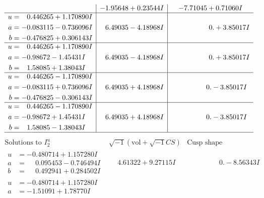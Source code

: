 \documentclass[1p]{elsarticle_modified}
\theoremstyle{definition}
\newcommand{\I}{\sqrt{-1}}
\begin{document}
$$\begin{array}{c|c|c}
 & -1.95648 + 0.23544 I & -7.71045 + 0.71060 I \\ \hline\begin{aligned}
u &= \phantom{-}0.446265 + 1.170890 I \\
a &= -0.083115 - 0.736096 I \\
b &= -0.476825 + 0.306143 I\end{aligned}
 & \phantom{-}6.49035 - 4.18968 I & \phantom{-0.000000 -}0. + 3.85017 I \\ \hline\begin{aligned}
u &= \phantom{-}0.446265 + 1.170890 I \\
a &= -0.98672 - 1.45431 I \\
b &= \phantom{-}1.58085 + 1.38043 I\end{aligned}
 & \phantom{-}6.49035 - 4.18968 I & \phantom{-0.000000 -}0. + 3.85017 I \\ \hline\begin{aligned}
u &= \phantom{-}0.446265 - 1.170890 I \\
a &= -0.083115 + 0.736096 I \\
b &= -0.476825 - 0.306143 I\end{aligned}
 & \phantom{-}6.49035 + 4.18968 I & \phantom{-0.000000 } 0. - 3.85017 I \\ \hline\begin{aligned}
u &= \phantom{-}0.446265 - 1.170890 I \\
a &= -0.98672 + 1.45431 I \\
b &= \phantom{-}1.58085 - 1.38043 I\end{aligned}
 & \phantom{-}6.49035 + 4.18968 I & \phantom{-0.000000 } 0. - 3.85017 I\\
 \hline 
 \end{array}$$\newpage$$\begin{array}{c|c|c}  
\text{Solutions to }I^u_{2}& \I (\text{vol} + \sqrt{-1}CS) & \text{Cusp shape}\\
 \hline 
\begin{aligned}
u &= -0.480714 + 1.157280 I \\
a &= \phantom{-}0.095453 - 0.746494 I \\
b &= \phantom{-}0.492941 + 0.284502 I\end{aligned}
 & \phantom{-}4.61322 + 9.27115 I & \phantom{-0.000000 } 0. - 8.56343 I \\ \hline\begin{aligned}
u &= -0.480714 + 1.157280 I \\
a &= -1.51091 + 1.78770 I \\

\end{aligned}
\end{array}$$
\end{document}
